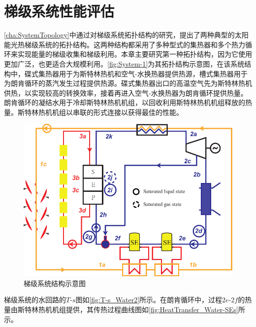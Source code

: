 \chapter{梯级系统性能评估}

\autoref{cha:SystemTopology}中通过对梯级系统拓扑结构的研究，提出了两种典型的太阳能光热梯级系统的拓扑结构。这两种结构都采用了多种型式的集热器和多个热力循环来实现能量的梯级收集和梯级利用。本章主要研究第一种拓扑结构，因为它使用更加广泛，也更适合大规模利用。\autoref{fig:System-1}为其拓扑结构示意图，在该系统结构中，碟式集热器用于为斯特林热机和空气-水换热器提供热源，槽式集热器用于为朗肯循环的蒸汽发生过程提供热源。碟式集热器出口的高温空气先为斯特林热机供热，以实现较高的转换效率，接着再进入空气-水换热器为朗肯循环提供热量。朗肯循环的凝结水用于冷却斯特林热机机组，以回收利用斯特林热机机组释放的热量。斯特林热机机组以串联的形式连接以获得最佳的性能。

\begin{figure}[htbp]
\centering
	\includegraphics[width = 0.8\columnwidth]{fig/cascadeSystem}
	\caption{梯级系统结构示意图}
	\label{fig:System-1}
\end{figure}

梯级系统的水回路的$T$-$s$图如\autoref{fig:T-s_Water2}所示。在朗肯循环中，过程$2e$-$2f$的热量由斯特林热机机组提供，其传热过程曲线图如\autoref{fig:HeatTransfer_Water-SEs}所示。


